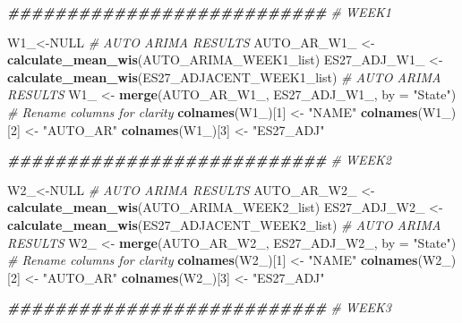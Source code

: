 \documentclass[
]{article}
\newenvironment{Shaded}{\begin{snugshade}}{\end{snugshade}}
\newcommand{\AttributeTok}[1]{\textcolor[rgb]{0.13,0.29,0.53}{#1}}
\newcommand{\CommentTok}[1]{\textcolor[rgb]{0.56,0.35,0.01}{\textit{#1}}}
\newcommand{\ConstantTok}[1]{\textcolor[rgb]{0.56,0.35,0.01}{#1}}
\newcommand{\DecValTok}[1]{\textcolor[rgb]{0.00,0.00,0.81}{#1}}
\newcommand{\DocumentationTok}[1]{\textcolor[rgb]{0.56,0.35,0.01}{\textbf{\textit{#1}}}}
\newcommand{\FunctionTok}[1]{\textcolor[rgb]{0.13,0.29,0.53}{\textbf{#1}}}
\newcommand{\NormalTok}[1]{#1}
\newcommand{\OtherTok}[1]{\textcolor[rgb]{0.56,0.35,0.01}{#1}}
\newcommand{\StringTok}[1]{\textcolor[rgb]{0.31,0.60,0.02}{#1}}
\begin{document}
\begin{Shaded}
\begin{Highlighting}[]
\DocumentationTok{\#\#\#\#\#\#\#\#\#\#\#\#\#\#\#\#\#\#\#\#\#\#\#\#\#\#\#}
\CommentTok{\# WEEK1}

\NormalTok{W1\_}\OtherTok{\textless{}{-}}\ConstantTok{NULL}
\CommentTok{\# AUTO ARIMA RESULTS}
\NormalTok{AUTO\_AR\_W1\_ }\OtherTok{\textless{}{-}} \FunctionTok{calculate\_mean\_wis}\NormalTok{(AUTO\_ARIMA\_WEEK1\_list)}
\NormalTok{ES27\_ADJ\_W1\_ }\OtherTok{\textless{}{-}} \FunctionTok{calculate\_mean\_wis}\NormalTok{(ES27\_ADJACENT\_WEEK1\_list)}
\CommentTok{\# AUTO ARIMA RESULTS}
\NormalTok{W1\_ }\OtherTok{\textless{}{-}} \FunctionTok{merge}\NormalTok{(AUTO\_AR\_W1\_, ES27\_ADJ\_W1\_, }\AttributeTok{by =} \StringTok{"State"}\NormalTok{)}
\CommentTok{\# Rename columns for clarity}
\FunctionTok{colnames}\NormalTok{(W1\_)[}\DecValTok{1}\NormalTok{] }\OtherTok{\textless{}{-}} \StringTok{"NAME"}
\FunctionTok{colnames}\NormalTok{(W1\_)[}\DecValTok{2}\NormalTok{] }\OtherTok{\textless{}{-}} \StringTok{"AUTO\_AR"}
\FunctionTok{colnames}\NormalTok{(W1\_)[}\DecValTok{3}\NormalTok{] }\OtherTok{\textless{}{-}} \StringTok{"ES27\_ADJ"}

\DocumentationTok{\#\#\#\#\#\#\#\#\#\#\#\#\#\#\#\#\#\#\#\#\#\#\#\#\#\#\#}
\CommentTok{\# WEEK2}

\NormalTok{W2\_}\OtherTok{\textless{}{-}}\ConstantTok{NULL}
\CommentTok{\# AUTO ARIMA RESULTS}
\NormalTok{AUTO\_AR\_W2\_ }\OtherTok{\textless{}{-}} \FunctionTok{calculate\_mean\_wis}\NormalTok{(AUTO\_ARIMA\_WEEK2\_list)}
\NormalTok{ES27\_ADJ\_W2\_ }\OtherTok{\textless{}{-}} \FunctionTok{calculate\_mean\_wis}\NormalTok{(ES27\_ADJACENT\_WEEK2\_list)}
\CommentTok{\# AUTO ARIMA RESULTS}
\NormalTok{W2\_ }\OtherTok{\textless{}{-}} \FunctionTok{merge}\NormalTok{(AUTO\_AR\_W2\_, ES27\_ADJ\_W2\_, }\AttributeTok{by =} \StringTok{"State"}\NormalTok{)}
\CommentTok{\# Rename columns for clarity}
\FunctionTok{colnames}\NormalTok{(W2\_)[}\DecValTok{1}\NormalTok{] }\OtherTok{\textless{}{-}} \StringTok{"NAME"}
\FunctionTok{colnames}\NormalTok{(W2\_)[}\DecValTok{2}\NormalTok{] }\OtherTok{\textless{}{-}} \StringTok{"AUTO\_AR"}
\FunctionTok{colnames}\NormalTok{(W2\_)[}\DecValTok{3}\NormalTok{] }\OtherTok{\textless{}{-}} \StringTok{"ES27\_ADJ"}

\DocumentationTok{\#\#\#\#\#\#\#\#\#\#\#\#\#\#\#\#\#\#\#\#\#\#\#\#\#\#\#}
\CommentTok{\# WEEK3}


\end{Highlighting}
\end{Shaded}
\end{document}
